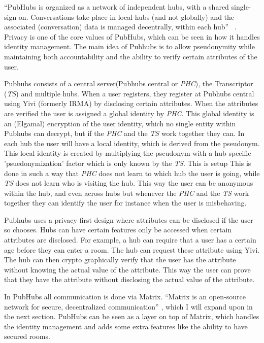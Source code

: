 \documentclass{report}
\begin{document}
“PubHubs is organized as a network of independent hubs, with a shared single-sign-on. Conversations take place in
local hubs (and not globally) and the associated (conversation) data is managed decentrally, within each hub”~
\cite{jacobs_pubhubs_2023}
. Privacy is one of the core values of PubHubs, which can be seen in how it handles identity management. The main
idea of Pubhubs is to allow pseudonymity while maintaining both accountability and the ability to verify certain
attributes of the user.

Pubhubs consists of a central server(Pubhubs central or \textit{PHC}), the Transcriptor (\textit{TS}) and multiple hubs.
When a user registers, they register at Pubhubs central using Yivi (formerly IRMA)\cite{alpar_irma_nodate} by disclosing
certain attributes. When the attributes are verified the user is assigned a global identity by \textit{PHC}.
This global identity is an (Elgamal) encryption of the user identity, which no single entity within Pubhubs
can decrypt, but if the \textit{PHC} and the \textit{TS} work together they can.
In each hub the user will have a local identity, which is derived from the pseudonym.
This local identity is created by multiplying the pseudonym with a hub specific
'psuedonymization' factor which is only known by the
\textit{TS}. This is setup This is done in such a way that \textit{PHC} does not learn to which hub the user is going, while
\textit{TS} does not learn who is visiting the hub.
This way the user can be anonymous within the hub, and even across hubs but whenever the
\textit{PHC} and the \textit{TS} work together they can identify the user for instance when the user is misbehaving.

Pubhubs uses a privacy first design where attributes can be disclosed if the user so chooses.
Hubs can have certain features only be accessed
when certain attributes are disclosed. For example, a hub can require that a user has a certain age before they can
enter a room. The hub can request these attribute using Yivi. The hub can then crypto graphically verify that the
user has the attribute without knowing the actual
value of
the attribute. This way the user can prove that they have the attribute without disclosing the actual value of the
attribute.

In PubHubs all communication is done via Matrix. “Matrix is an open-source network for secure, decentralized
communication” \cite{noauthor_matrixorg_nodate}, which I will expand upon in the next section. PubHubs can be seen as a
layer on top of Matrix, which handles the identity management and adds some extra features like the ability to have
secured rooms.
\end{document}
